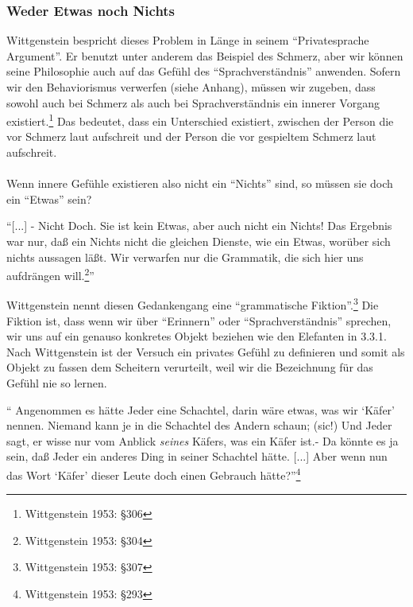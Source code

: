 \documentclass[10pt,a4paper]{article}
\begin{document}
\subsubsection{Weder Etwas noch Nichts}
Wittgenstein bespricht dieses Problem in Länge in seinem \enquote{Privatesprache Argument}. Er benutzt unter anderem das Beispiel des Schmerz, aber wir können seine Philosophie auch auf das Gefühl des \enquote{Sprachverständnis} anwenden. Sofern wir den Behaviorismus verwerfen (siehe Anhang), müssen wir zugeben, dass sowohl auch bei Schmerz als auch bei Sprachverständnis ein innerer Vorgang existiert.\footnote{Wittgenstein 1953: §306} Das bedeutet, dass ein Unterschied existiert, zwischen der Person die vor Schmerz laut aufschreit und der Person die vor gespieltem Schmerz laut aufschreit. \\
\\
Wenn innere Gefühle existieren also nicht ein \enquote{Nichts} sind, so müssen sie doch ein \enquote{Etwas} sein?

\begin{displayquote}
\enquote{[...] - Nicht Doch. Sie ist kein Etwas, aber auch nicht ein Nichts! Das Ergebnis war nur, daß ein Nichts nicht die gleichen Dienste, wie ein Etwas, worüber sich nichts aussagen läßt. Wir verwarfen nur die Grammatik, die sich hier uns aufdrängen will.\footnote{Wittgenstein 1953: §304}}
\end{displayquote}
Wittgenstein nennt diesen Gedankengang eine \enquote{grammatische Fiktion}.\footnote{Wittgenstein 1953: §307} Die Fiktion ist, dass wenn wir über \enquote{Erinnern} oder \enquote{Sprachverständnis} sprechen, wir uns auf ein genauso konkretes Objekt beziehen wie den Elefanten in 3.3.1. Nach Wittgenstein ist der Versuch ein privates Gefühl zu definieren und somit als Objekt zu fassen dem Scheitern verurteilt, weil wir die Bezeichnung für das Gefühl nie so lernen.

\begin{displayquote}
\enquote{
Angenommen es hätte Jeder eine Schachtel, darin wäre etwas, was wir \enquote{Käfer} nennen. Niemand kann je in die Schachtel des Andern schaun; (sic!) Und Jeder sagt, er wisse nur vom Anblick \textit{seines} Käfers, was ein Käfer ist.- Da könnte es ja sein, daß Jeder ein anderes Ding in seiner Schachtel hätte. [...] Aber wenn nun das Wort \enquote{Käfer} dieser Leute doch einen Gebrauch hätte?}\footnote{Wittgenstein 1953: §293}
\end{displayquote}
\end{document}
